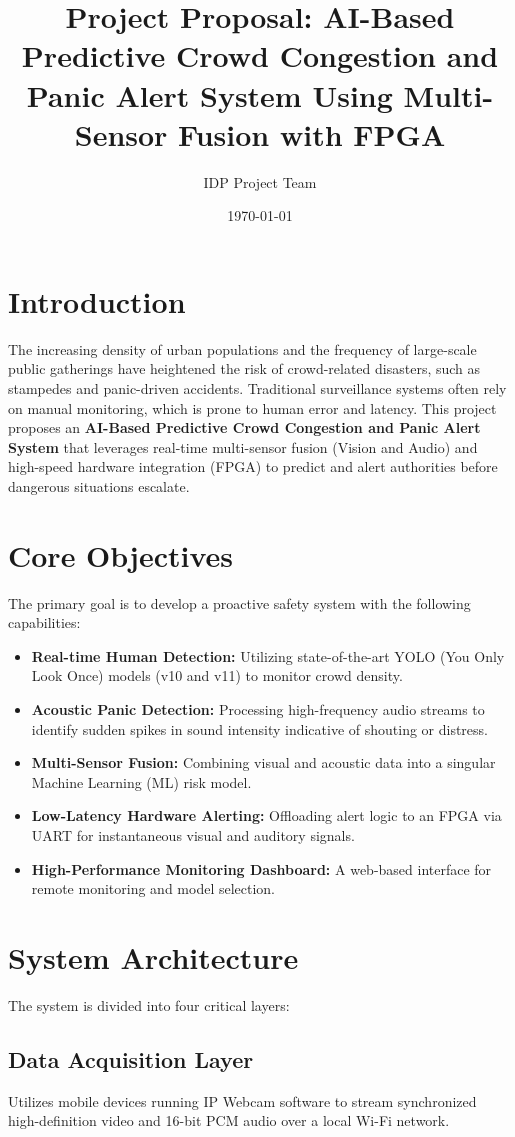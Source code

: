 \documentclass[12pt,a4paper]{article}
\title{\textbf{Project Proposal: AI-Based Predictive Crowd Congestion and Panic Alert System Using Multi-Sensor Fusion with FPGA}}
\author{IDP Project Team}
\date{\today}
\begin{document}
\maketitle

\section{Introduction}
The increasing density of urban populations and the frequency of large-scale public gatherings have heightened the risk of crowd-related disasters, such as stampedes and panic-driven accidents. Traditional surveillance systems often rely on manual monitoring, which is prone to human error and latency. This project proposes an \textbf{AI-Based Predictive Crowd Congestion and Panic Alert System} that leverages real-time multi-sensor fusion (Vision and Audio) and high-speed hardware integration (FPGA) to predict and alert authorities before dangerous situations escalate.

\section{Core Objectives}
The primary goal is to develop a proactive safety system with the following capabilities:
\begin{itemize}
    \item \textbf{Real-time Human Detection:} Utilizing state-of-the-art YOLO (You Only Look Once) models (v10 and v11) to monitor crowd density.
    \item \textbf{Acoustic Panic Detection:} Processing high-frequency audio streams to identify sudden spikes in sound intensity indicative of shouting or distress.
    \item \textbf{Multi-Sensor Fusion:} Combining visual and acoustic data into a singular Machine Learning (ML) risk model.
    \item \textbf{Low-Latency Hardware Alerting:} Offloading alert logic to an FPGA via UART for instantaneous visual and auditory signals.
    \item \textbf{High-Performance Monitoring Dashboard:} A web-based interface for remote monitoring and model selection.
\end{itemize}

\section{System Architecture}
The system is divided into four critical layers:
\subsection{Data Acquisition Layer}
Utilizes mobile devices running IP Webcam software to stream synchronized high-definition video and 16-bit PCM audio over a local Wi-Fi network.
\end{document}
